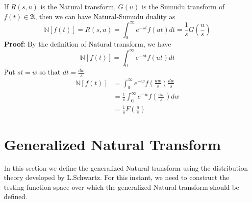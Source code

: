 \begin{enumerate}
 If $ R(s,u)$ is the Natural transform, $G(u)$ is the  Sumudu transform of $f(t) \in \mathfrak{A}$, then we  can have Natural-Sumudu duality as
 \begin{equation}
\mathbb{N}[f(t)] = R(s,u) = \int_{0}^{\infty}e^{-st}f(ut)dt =\frac{1}{s}G(\frac{u}{s})
 \end{equation}
 \textbf{Proof:}
 By the definition of Natural transform, we have
 \begin{equation*}
 \mathbb{N}[f(t)] = \int_{0}^{\infty}e^{-st}f(ut)dt 
 \end{equation*}
 Put $ st=w $ so that $ dt=\frac{dw}{s} $ 
 \begin{align*}
  \mathbb{N}[f(t)]& = \int_{0}^{\infty}e^{-w}f(\frac{uw}{s})\frac{dw}{s}\\
  & = \frac{1}{s}\int_{0}^{\infty}e^{-w}f(\frac{uw}{s})dw\\
&=  \frac{1}{s}F(\frac{u}{s})
 \end{align*}
 \end{enumerate}
\section{Generalized Natural Transform}
         In this section we define the generalized Natural transform using the distribution theory developed by L.Schwartz\cite{R72,R73}. For this instant, we need to construct the testing function space over which the generalized Natural transform should be defined.
